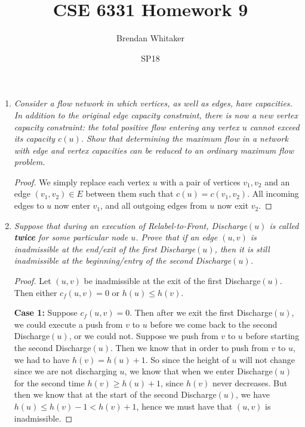 \documentclass[12pt,oneside,reqno]{amsart}
\theoremstyle{plain}
\theoremstyle{definition}
\theoremstyle{remark}
\newcommand{\bb}{\vspace{3mm}}
\begin{document}
\title{CSE 6331 Homework 9}

\date{SP18}

\author[Brendan Whitaker]{Brendan Whitaker}

\maketitle



\begin{enumerate}[label=\arabic*.]
\item \textit{Consider a flow network in which vertices, as well as edges, have capacities.  
In addition to the 
original edge capacity constraint, 
there is now a new vertex capacity constraint: 
the total positive flow 
entering any vertex $u$ cannot exceed its capacity $c(u)$. Show that determining the maximum flow in a 
network with edge and vertex capacities can be reduced to an ordinary maximum flow problem. }

\bb

\begin{proof}
We simply replace each vertex $u$ with a pair of vertices $v_1,v_2$ and an edge $(v_1,v_2) \in E$ between them such that $c(u) = c(v_1,v_2)$. All incoming edges to $u$ now enter $v_1$, and all outgoing edges from $u$ now exit $v_2$.  
\end{proof}

\item \textit{Suppose that during an execution of Relabel-to-Front, Discharge$(u)$ is called \textbf{twice} for some particular node $u$. Prove that if an edge $(u,v)$ is inadmissible at the end/exit of the first Discharge$(u)$, then it is still inadmissible at the beginning/entry of the second Discharge$(u)$. }

\bb

\begin{proof}
Let $(u,v)$ be inadmissible at the exit of the first Discharge$(u)$. Then either $c_f(u,v) = 0$ or $h(u) \leq h(v)$. 

\bb


\textbf{Case 1:} Suppose $c_f(u,v) = 0$. Then after we exit the first Discharge$(u)$, we could execute a push from $v$ to $u$ before we come back to the second Discharge$(u)$, or we could not. Suppose we push from $v$ to $u$ before starting the second Discharge$(u)$. Then we know that in order to push from $v$ to $u$, we had to have $h(v) = h(u) + 1$. So since the height of $u$ will not change since we are not discharging $u$, we know that when we enter Discharge$(u)$ for the second time $h(v) \geq h(u) + 1$, since $h(v)$ never decreases. But then we know that at the start of the second Discharge$(u)$, we have $h(u) \leq h(v) - 1 < h(v) + 1$, hence we must have that $(u,v)$ is inadmissible. 


\end{proof}
\end{enumerate}
\end{document}
